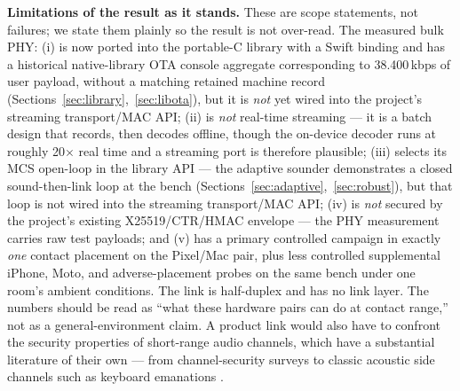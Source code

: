 \documentclass[11pt]{article}
\begin{document}
\textbf{Limitations of the result as it stands.} These are scope statements,
not failures; we state them plainly so the result is not over-read. The
measured bulk PHY: (i) is now ported into the portable-C library with a Swift
binding and has a historical native-library OTA console aggregate corresponding
to 38.400\,kbps of user payload, without a matching retained machine record
(Sections~\ref{sec:library},~\ref{sec:libota}), but it is \emph{not}
yet wired into the project's streaming transport/MAC API; (ii) is \emph{not}
real-time streaming --- it is a batch design that records, then decodes
offline, though the on-device decoder runs at roughly 20$\times$ real time and
a streaming port is therefore plausible; (iii) selects its MCS open-loop in the library API --- the adaptive sounder
demonstrates a closed sound-then-link loop at the bench
(Sections~\ref{sec:adaptive},~\ref{sec:robust}), but that loop is not wired
into the streaming transport/MAC API; (iv) is \emph{not} secured by the
project's existing X25519/CTR/HMAC envelope --- the PHY measurement carries
raw test payloads; and (v) has a primary controlled campaign in exactly
\emph{one} contact placement on the Pixel/Mac pair, plus less controlled
supplemental iPhone, Moto, and adverse-placement probes on the same bench under
one room's ambient conditions. The link is half-duplex and has no link layer.
The numbers should be read as ``what these hardware pairs can do at contact
range,'' not as a general-environment claim. A product link would also have to
confront the security properties of short-range audio channels, which have a
substantial literature of their own --- from channel-security surveys
\cite{audiosecsurvey} to classic acoustic side channels such as keyboard
emanations \cite{kbdacoustic}.
\end{document}
